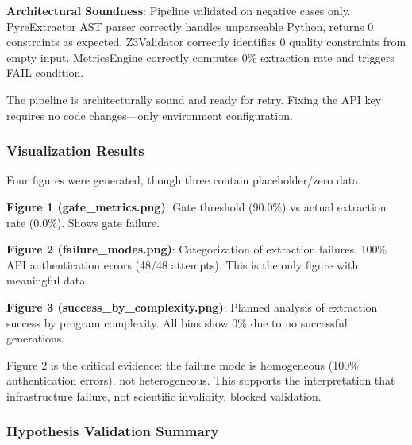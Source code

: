 \textbf{Architectural Soundness}: Pipeline validated on negative cases only. PyreExtractor AST parser correctly handles unparseable Python, returns 0 constraints as expected. Z3Validator correctly identifies 0 quality constraints from empty input. MetricsEngine correctly computes 0\% extraction rate and triggers FAIL condition.

The pipeline is architecturally sound and ready for retry. Fixing the API key requires no code changes---only environment configuration.

\subsubsection{Visualization Results}

Four figures were generated, though three contain placeholder/zero data.

\textbf{Figure 1 (gate\_metrics.png)}: Gate threshold (90.0\%) vs actual extraction rate (0.0\%). Shows gate failure.

\textbf{Figure 2 (failure\_modes.png)}: Categorization of extraction failures. 100\% API authentication errors (48/48 attempts). This is the only figure with meaningful data.

\textbf{Figure 3 (success\_by\_complexity.png)}: Planned analysis of extraction success by program complexity. All bins show 0\% due to no successful generations.

Figure 2 is the critical evidence: the failure mode is homogeneous (100\% authentication errors), not heterogeneous. This supports the interpretation that infrastructure failure, not scientific invalidity, blocked validation.

\subsubsection{Hypothesis Validation Summary}

\begin{table}[htbp]
\centering
{}
\end{table}

